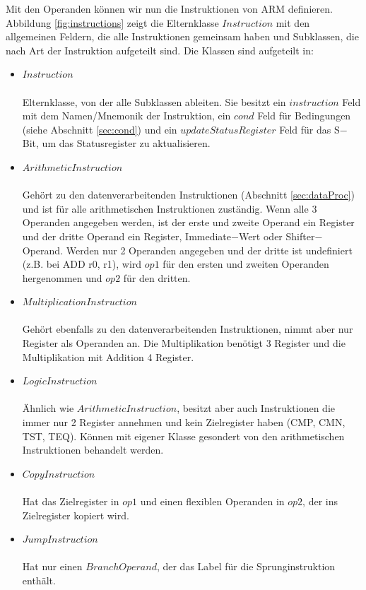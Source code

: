 \documentclass[a4paper, 11pt, onecolumn]{article}
\begin{document}
Mit den Operanden können wir nun die Instruktionen von ARM definieren. Abbildung \ref{fig:instructions} zeigt die Elternklasse $Instruction$ mit den allgemeinen Feldern, die alle Instruktionen gemeinsam haben und Subklassen, die nach Art der Instruktion aufgeteilt sind. Die Klassen sind aufgeteilt in:
\newpage
\begin{itemize}
\item $Instruction$\\ \\Elternklasse, von der alle Subklassen ableiten. Sie besitzt ein $instruction$ Feld mit dem Namen/Mnemonik der Instruktion, ein $cond$ Feld für Bedingungen (siehe Abschnitt \ref{sec:cond}) und ein $updateStatusRegister$ Feld für das S$-$Bit, um das Statusregister zu aktualisieren.
\item $ArithmeticInstruction$\\ \\Gehört zu den datenverarbeitenden Instruktionen (Abschnitt \ref{sec:dataProc}) und ist für alle arithmetischen Instruktionen zuständig. Wenn alle 3 Operanden angegeben werden, ist der erste und zweite Operand ein Register und der dritte Operand ein Register, Immediate$-$Wert oder Shifter$-$Operand. Werden nur 2 Operanden angegeben und der dritte ist undefiniert (z.B. bei ADD r0, r1), wird $op1$ für den ersten und zweiten Operanden hergenommen und $op2$ für den dritten.
\item $MultiplicationInstruction$\\ \\Gehört ebenfalls zu den datenverarbeitenden Instruktionen, nimmt aber nur Register als Operanden an. Die Multiplikation benötigt 3 Register und die Multiplikation mit Addition 4 Register.
\item $LogicInstruction$\\ \\Ähnlich wie $ArithmeticInstruction$, besitzt aber auch Instruktionen die immer nur 2 Register annehmen und kein Zielregister haben (CMP, CMN, TST, TEQ). Können mit eigener Klasse gesondert von den arithmetischen Instruktionen behandelt werden.
\item $CopyInstruction$\\ \\Hat das Zielregister in $op1$ und einen flexiblen Operanden in $op2$, der ins Zielregister kopiert wird.
\item $JumpInstruction$\\ \\Hat nur einen $BranchOperand$, der das Label für die Sprunginstruktion enthält.

\end{itemize}
\end{document}
